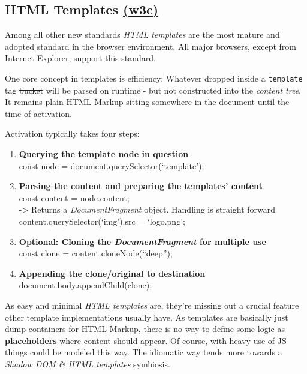 \documentclass[]{article}
\providecommand{\tightlist}{%
  \setlength{\itemsep}{0pt}\setlength{\parskip}{0pt}}
\begin{document}
\subsection{\texorpdfstring{HTML Templates
\href{https://www.w3.org/TR/html5/scripting-1.html\#the-template-element}{(w3c)}}{HTML Templates (w3c)}}\label{html-templates-w3c}

Among all other new standards \emph{HTML templates} are the most mature
and adopted standard in the browser environment. All major browsers,
except from Internet Explorer, support this standard.

One core concept in templates is efficiency: Whatever dropped inside a
\texttt{template} tag \sout{bucket} will be parsed on runtime - but not
constructed into the \emph{content tree}. It remains plain HTML Markup
sitting somewhere in the document until the time of activation.

Activation typically takes four steps:

\begin{enumerate}
\def\labelenumi{\arabic{enumi}.}
\tightlist
\item
  \textbf{Querying the template node in question}\\
  const node = document.querySelector(`template');
\item
  \textbf{Parsing the content and preparing the templates' content}\\
  const content = node.content;\\
  -\textgreater{} Returns a \emph{DocumentFragment} object. Handling is
  straight forward content.querySelector(`img').src = `logo.png';
\item
  \textbf{Optional: Cloning the \emph{DocumentFragment} for multiple
  use}\\
  const clone = content.cloneNode(``deep'');
\item
  \textbf{Appending the clone/original to destination}\\
  document.body.appendChild(clone);
\end{enumerate}

As easy and minimal \emph{HTML templates} are, they're missing out a
crucial feature other template implementations usually have. As
templates are basically just dump containers for HTML Markup, there is
no way to define some logic as \textbf{placeholders} where content
should appear. Of course, with heavy use of JS things could be modeled
this way. The idiomatic way tends more towards a \emph{Shadow DOM \&
HTML templates} symbiosis.
\end{document}
